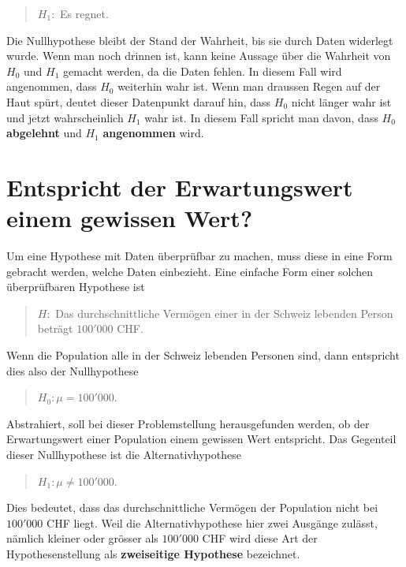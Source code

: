 \documentclass[
]{book}
\theoremstyle{definition}
\theoremstyle{definition}
\theoremstyle{definition}
\theoremstyle{definition}
\theoremstyle{remark}
\begin{document}
\begin{quote}
\(H_1:\) Es regnet.
\end{quote}

Die Nullhypothese bleibt der Stand der Wahrheit, bis sie durch Daten widerlegt wurde. Wenn man noch drinnen ist, kann keine Aussage über die Wahrheit von \(H_0\) und \(H_1\) gemacht werden, da die Daten fehlen. In diesem Fall wird angenommen, dass \(H_0\) weiterhin wahr ist. Wenn man draussen Regen auf der Haut spürt, deutet dieser Datenpunkt darauf hin, dass \(H_0\) nicht länger wahr ist und jetzt wahrscheinlich \(H_1\) wahr ist. In diesem Fall spricht man davon, dass \(H_0\) \textbf{abgelehnt} und \(H_1\) \textbf{angenommen} wird.

\section{Entspricht der Erwartungswert einem gewissen Wert?}\label{entspricht-der-erwartungswert-einem-gewissen-wert}

Um eine Hypothese mit Daten überprüfbar zu machen, muss diese in eine Form gebracht werden, welche Daten einbezieht. Eine einfache Form einer solchen überprüfbaren Hypothese ist

\begin{quote}
\(H:\) Das durchschnittliche Vermögen einer in der Schweiz lebenden Person beträgt \(100'000\) CHF.
\end{quote}

Wenn die Population alle in der Schweiz lebenden Personen sind, dann entspricht dies also der Nullhypothese

\begin{quote}
\(H_0:\mu = 100'000\).
\end{quote}

Abstrahiert, soll bei dieser Problemstellung herausgefunden werden, ob der Erwartungswert einer Population einem gewissen Wert entspricht. Das Gegenteil dieser Nullhypothese ist die Alternativhypothese

\begin{quote}
\(H_1: \mu \neq 100'000\).
\end{quote}

Dies bedeutet, dass das durchschnittliche Vermögen der Population nicht bei \(100'000\) CHF liegt. \label{customdef-zweiseitige-hypothese}{Weil die Alternativhypothese hier zwei Ausgänge zulässt, nämlich kleiner oder grösser als \(100'000\) CHF wird diese Art der Hypothesenstellung als \textbf{zweiseitige Hypothese} bezeichnet.}
\end{document}
